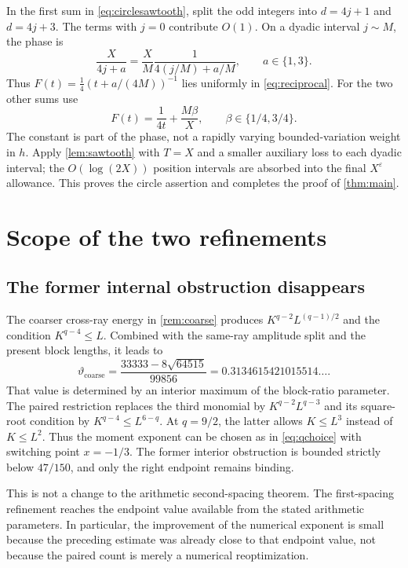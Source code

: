 \documentclass[11pt,reqno]{amsart}
\numberwithin{equation}{section}
\theoremstyle{definition}
\theoremstyle{remark}
\newcommand{\eps}{\varepsilon}
\newcommand{\vth}{\vartheta}
\begin{document}
In the first sum in \eqref{eq:circlesawtooth}, split the odd integers into $d=4j+1$ and $d=4j+3$.
The terms with $j=0$ contribute $O(1)$.
On a dyadic interval $j\sim M$, the phase is
\[
 \frac X{4j+a}=\frac XM\frac1{4(j/M)+a/M},\qquad a\in\{1,3\}.
\]
Thus $F(t)=\frac14(t+a/(4M))^{-1}$ lies uniformly in \eqref{eq:reciprocal}.
For the two other sums use
\[
 F(t)=\frac1{4t}+\frac{M\beta}{X},\qquad \beta\in\{1/4,3/4\}.
\]
The constant is part of the phase, not a rapidly varying bounded-variation weight in $h$.
Apply \cref{lem:sawtooth} with $T=X$ and a smaller auxiliary loss to each dyadic interval; the $O(\log(2X))$ position intervals are absorbed into the final $X^\eps$ allowance.
This proves the circle assertion and completes the proof of \cref{thm:main}.

\section{Scope of the two refinements}\label{sec:limit}
\subsection{The former internal obstruction disappears}
The coarser cross-ray energy in \cref{rem:coarse} produces
$K^{q-2}L^{(q-1)/2}$ and the condition $K^{q-4}\le L$.
Combined with the same-ray amplitude split and the present block lengths, it leads to
\[
 \vth_{\mathrm{coarse}}
 =\frac{33333-8\sqrt{64515}}{99856}
 =0.3134615421015514\ldots.
\]
That value is determined by an interior maximum of the block-ratio parameter.
The paired restriction replaces the third monomial by $K^{q-2}L^{q-3}$ and its square-root condition by $K^{q-4}\le L^{6-q}$.
At $q=9/2$, the latter allows $K\le L^3$ instead of $K\le L^2$.
Thus the moment exponent can be chosen as in \eqref{eq:qchoice} with switching point $x=-1/3$.
The former interior obstruction is bounded strictly below $47/150$, and only the right endpoint remains binding.

This is not a change to the arithmetic second-spacing theorem.
The first-spacing refinement reaches the endpoint value available from the stated arithmetic parameters.
In particular, the improvement of the numerical exponent is small because the preceding estimate was already close to that endpoint value, not because the paired count is merely a numerical reoptimization.
\end{document}
